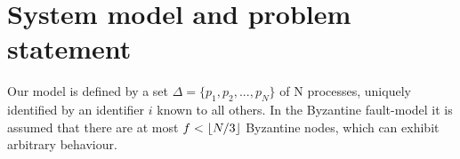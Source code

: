 \section{System model and problem statement}
\label{system-model}



Our model is defined by a set $\Delta=\{p_1, p_2,...,p_N\}$ of N processes, uniquely identified by an identifier $i$ known to all others. In the Byzantine fault-model it is assumed that there are at most $f < \lfloor N/3\rfloor$ Byzantine nodes, which can exhibit arbitrary behaviour. 

